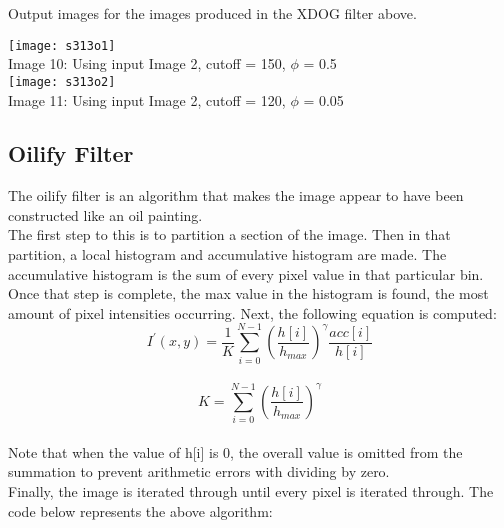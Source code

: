 \documentclass{article}
\begin{document}
	Output images for the images produced in the XDOG filter above.\\
	
	\begin{center}
		
		\texttt{[image: s313o1]}\\
		Image 10: Using input Image 2, cutoff = 150, $\phi$ = 0.5\\
		
		\texttt{[image: s313o2]}\\
		Image 11: Using input Image 2, cutoff = 120, $\phi$ = 0.05\\

	\end{center}
	
	\subsection{Oilify Filter}
	
	The oilify filter is an algorithm that makes the image appear to have been constructed like an oil painting.\\
	
	The first step to this is to partition a section of the image. Then in that partition, a local histogram and accumulative histogram are made. The accumulative histogram is the sum of every pixel value in that particular bin. Once that step is complete, the max value in the histogram is found, the most amount of pixel intensities occurring. Next, the following equation is computed:\\

	\begin{equation}
		I^{\prime}(x,y) = \frac{1}{K} \sum_{i=0}^{N-1}\left( \frac{h[i]}{h_{max}}\right) ^{\gamma} \frac{acc[i]}{h[i]}
	\end{equation}\\
	
	\begin{equation}
	K =  \sum_{i=0}^{N-1}\left( \frac{h[i]}{h_{max}}\right) ^{\gamma}
	\end{equation}\\
	
	Note that when the value of h[i] is 0, the overall value is omitted from the summation to prevent arithmetic errors with dividing by zero.\\
	
	Finally, the image is iterated through until every pixel is iterated through. The code below represents the above algorithm:\\
	
\end{document}
